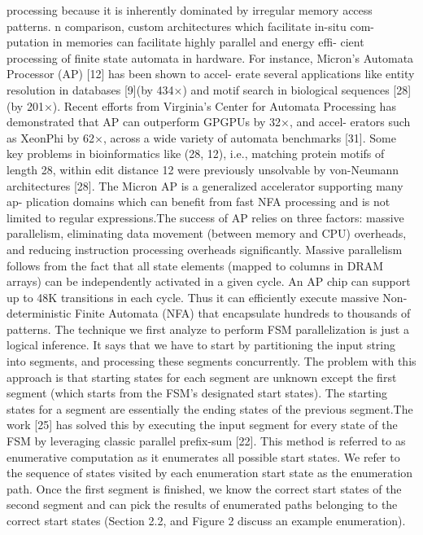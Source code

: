 processing because it is inherently dominated by irregular memory
access patterns. 
n comparison, custom architectures which facilitate in-situ com-
putation in memories can facilitate highly parallel and energy effi-
cient processing of finite state automata in hardware. For instance,
Micron’s Automata Processor (AP) [12] has been shown to accel-
erate several applications like entity resolution in databases [9](by
434×) and motif search in biological sequences [28] (by 201×).
Recent efforts from Virginia’s Center for Automata Processing has
demonstrated that AP can outperform GPGPUs by 32×, and accel-
erators such as XeonPhi by 62×, across a wide variety of automata
benchmarks [31]. Some key problems in bioinformatics like (28,
12), i.e., matching protein motifs of length 28, within edit distance
12 were previously unsolvable by von-Neumann architectures [28].
The Micron AP is a generalized accelerator supporting many ap-
plication domains which can benefit from fast NFA processing and is
not limited to regular expressions.The success of AP relies on three
factors: massive parallelism, eliminating data movement (between
memory and CPU) overheads, and reducing instruction processing
overheads significantly. Massive parallelism follows from the fact that all state elements (mapped to columns in DRAM arrays) can be
independently activated in a given cycle. An AP chip can support
up to 48K transitions in each cycle. Thus it can efficiently execute
massive Non-deterministic Finite Automata (NFA) that encapsulate
hundreds to thousands of patterns.
The technique we first analyze to perform FSM parallelization is just a logical inference. It says that we have to start by partitioning the input string into segments, and processing these segments concurrently. The problem with this approach is that starting states for each segment are unknown except the first segment (which starts from the FSM’s designated start states). The starting states for a segment are essentially the ending states of the previous segment.The work [25] has solved this by executing the input segment for every
state of the FSM by leveraging classic parallel prefix-sum [22]. This
method is referred to as enumerative computation as it enumerates
all possible start states. We refer to the sequence of states visited by
each enumeration start state as the enumeration path. Once the first
segment is finished, we know the correct start states of the second
segment and can pick the results of enumerated paths belonging to
the correct start states (Section 2.2, and Figure 2 discuss an example
enumeration).\\
